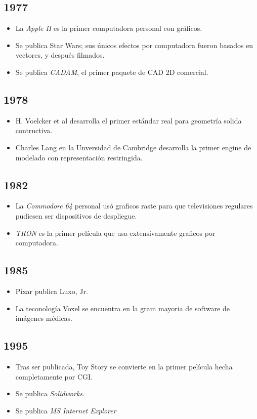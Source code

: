 \documentclass[letterpaper, 12pt]{article}
\begin{document}
\begin{justify}
        \subsection*{1977}
        \begin{itemize}
            \item La \emph{Apple II} es la primer computadora personal con gráficos.
            \item Se publica Star Wars; sus únicos efectos por computadora fueron basados en vectores, y después filmados.
            \item Se publica \emph{CADAM}, el primer paquete de CAD 2D comercial.
        \end{itemize}
        \subsection*{1978}
        \begin{itemize}
            \item H. Voelcker et al desarrolla el primer estándar real para geometría solida contructiva.
            \item Charles Lang en la Unversidad de Cambridge desarrolla la primer engine de modelado con representación restringida.
        \end{itemize}
        \subsection*{1982}
        \begin{itemize}
            \item La \emph{Commodore 64} personal usó graficos raste para que televisiones regulares pudiesen ser dispositivos de despliegue.
            \item \emph{TRON} es la primer película que usa extensivamente graficos por computadora.
        \end{itemize}
        \subsection*{1985}
        \begin{itemize}
            \item Pixar publica Luxo, Jr.
            \item La teconología Voxel se encuentra en la gram mayoria de software de imágenes médicas.
        \end{itemize}
        \subsection*{1995}
        \begin{itemize}
            \item Tras ser publicada, Toy Story se convierte en la primer película hecha completamente por CGI.
            \item Se publica \emph{Solidworks.}
            \item Se publica \emph{MS Internet Explorer}
        \end{itemize}


\end{justify}
\end{document}
